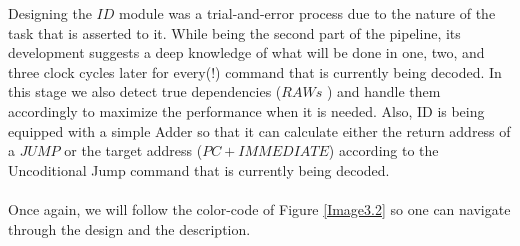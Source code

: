  	Designing the $ID$ module was a trial-and-error process due to the nature of the task that is asserted to it. While being the second part of the pipeline, its development suggests a deep knowledge of what will be done in one, two, and three clock cycles later for every(!) command that is currently being decoded. In this stage we also detect true dependencies ($RAWs$ %
 	) and handle them accordingly to maximize the performance when it is needed. Also, ID is being equipped with a simple \textcolor{byzantium}{Adder} so that it can calculate either the return address of a $JUMP$ or the target address ($PC+IMMEDIATE$) according to the Uncoditional Jump command that is currently being decoded. \\\\
 	Once again, we will follow the color-code of Figure \ref{Image3.2} so one can navigate through the design and the description.
 	
 	\clearpage
